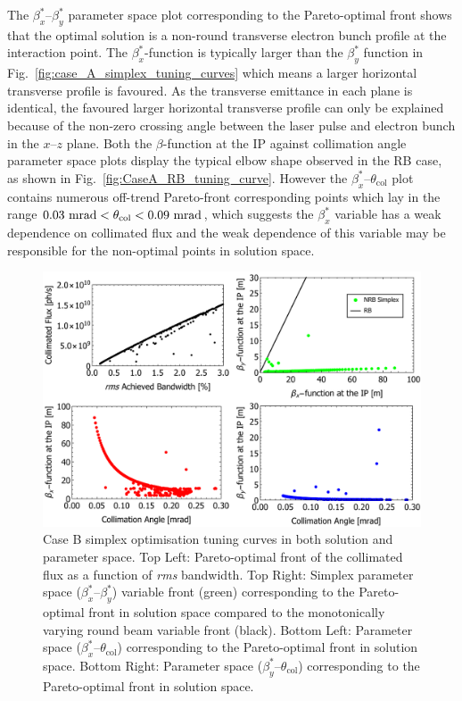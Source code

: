 \documentclass[../main.tex]{subfiles}
\begin{document}
The $\beta_{x}^{*}$--$\beta_{y}^{*}$ parameter space plot corresponding to the Pareto-optimal front shows that the optimal solution is a non-round transverse electron bunch profile at the interaction point. The $\beta_{x}^{*}$-function is typically larger than the $\beta_{y}^{*}$ function in Fig.~\ref{fig:case_A_simplex_tuning_curves} which means a larger horizontal transverse profile is favoured. As the transverse emittance in each plane is identical, the favoured larger horizontal transverse profile can only be explained because of the non-zero crossing angle between the laser pulse and electron bunch in the $x$--$z$ plane. Both the $\beta$-function at the IP against collimation angle parameter space plots display the typical elbow shape observed in the RB case, as shown in Fig.~\ref{fig:CaseA_RB_tuning_curve}. However the $\beta_{x}^{*}$--$\theta_{\mathrm{col}}$ plot contains numerous off-trend Pareto-front corresponding points which lay in the range $0.03~\textrm{\si{\milli\radian}} < \theta_{\mathrm{col}} < 0.09~\mathrm{\si{\milli\radian}}$, which suggests the $\beta_{x}^{*}$ variable has a weak dependence on collimated flux and the weak dependence of this variable may be responsible for the non-optimal points in solution space.  

\begin{figure}[!h]
\centering
\includegraphics[width=\textwidth]{Figures/Optimisation_and_Characterisation_of_Inverse_Compton_Scattering_Sources/Case_B_simplex_Tuning_Curves.pdf}
\caption{Case B simplex optimisation tuning curves in both solution and parameter space. Top Left: Pareto-optimal front of the collimated flux as a function of \textit{rms} bandwidth. Top Right: Simplex parameter space ($\beta_{x}^{*}$--$\beta_{y}^{*}$) variable front (green) corresponding to the Pareto-optimal front in solution space compared to the monotonically varying round beam variable front (black). Bottom Left: Parameter space ($\beta_{x}^{*}$--$\theta_{\mathrm{col}}$) corresponding to the Pareto-optimal front in solution space. Bottom Right: Parameter space ($\beta_{y}^{*}$--$\theta_{\mathrm{col}}$) corresponding to the Pareto-optimal front in solution space.}
\label{fig:case_B_simplex_tuning_curves}
\end{figure}
\end{document}
